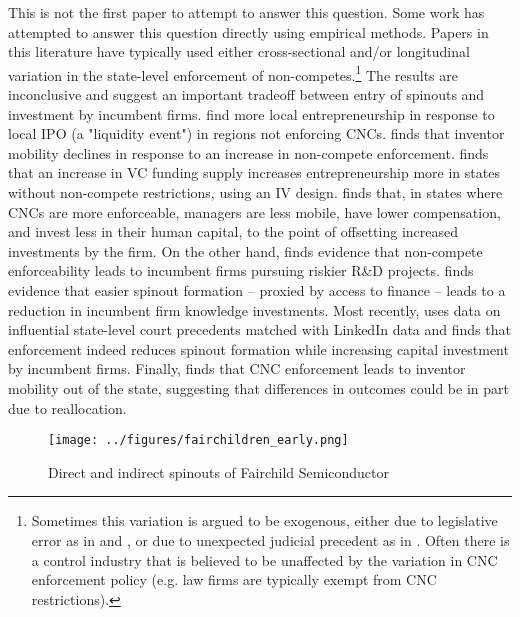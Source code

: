 \documentclass[12pt,english]{article}
\theoremstyle{remark}
\begin{document}
This is not the first paper to attempt to answer this question. Some work has attempted to answer this question directly using empirical methods. Papers in this literature have typically used either cross-sectional and/or longitudinal variation in the state-level enforcement of non-competes.\footnote{Sometimes this variation is argued to be exogenous, either due to legislative error as in \cite{marx_mobility_2009} and \cite{marx_regional_2015}, or due to unexpected judicial precedent as in \cite{jeffers_impact_2018}. Often there is a control industry that is believed to be unaffected by the variation in CNC enforcement policy (e.g. law firms are typically exempt from CNC restrictions).} The results are inconclusive and suggest an important tradeoff between entry of spinouts and investment by incumbent firms. \cite{stuart_liquidity_2003} find more local  entrepreneurship in response to local IPO (a "liquidity event") in regions not enforcing CNCs. \cite{marx_mobility_2009} finds that inventor mobility declines in response to an increase in non-compete enforcement. \cite{samila_venture_2010} finds that an increase in VC funding supply increases entrepreneurship more in states without non-compete restrictions, using an IV design. \cite{garmaise_ties_2011} finds that, in states where CNCs are more enforceable, managers are less mobile, have lower compensation, and invest less in their human capital, to the point of offsetting increased investments by the firm. On the other hand, \cite{conti_non-competition_2014} finds evidence that non-compete enforceability leads to incumbent firms pursuing riskier R\&D projects. \cite{colombo_does_2013} finds evidence that easier spinout formation -- proxied by access to finance -- leads to a reduction in incumbent firm knowledge investments.  Most recently, \cite{jeffers_impact_2018} uses data on influential state-level court precedents matched with LinkedIn data and finds that enforcement indeed reduces spinout formation while increasing capital investment by incumbent firms. Finally, \cite{marx_regional_2015} finds that CNC enforcement leads to inventor mobility out of the state, suggesting that differences in outcomes could be in part due to reallocation. 


\begin{figure}	
	\center
	\texttt{[image: ../figures/fairchildren\_early.png]}
	\caption{Direct and indirect spinouts of Fairchild Semiconductor}
	\label{fairchild_spinouts}
\end{figure}
\end{document}
